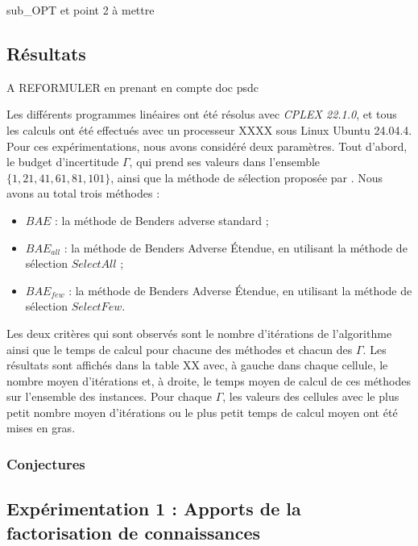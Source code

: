 \documentclass[12pt, a4paper, twoside]{article}
\numberwithin{equation}{section}
\begin{document}
	\newpage
	sub\_OPT et point 2 à mettre
	
	\subsection{Résultats} A REFORMULER en prenant en compte doc psdc
    
	Les différents programmes linéaires ont été résolus avec \textit{CPLEX 22.1.0}, et tous les calculs ont été effectués avec un processeur XXXX sous Linux Ubuntu 24.04.4. Pour ces expérimentations, nous avons considéré deux paramètres. Tout d'abord, le budget d'incertitude $\Gamma$, qui prend ses valeurs dans l'ensemble $\{1, 21, 41, 61, 81,101\}$, ainsi que la méthode de sélection proposée par \cite{portoleauTHESIS}. Nous avons au total trois méthodes :
	
	\begin{itemize}
		\item[] $BAE$ : la méthode de Benders adverse standard ;
		\item[] $BAE_{all}$ : la méthode de  Benders Adverse Étendue, en utilisant la méthode de sélection $SelectAll$ ;
		\item[] $BAE_{few}$ : la méthode de  Benders Adverse Étendue, en utilisant la méthode de sélection $SelectFew$.
	\end{itemize}
	
	Les deux critères qui sont observés sont le nombre d'itérations de l'algorithme ainsi que le temps de calcul pour chacune des méthodes et chacun des $\Gamma$. Les résultats sont affichés dans la table XX avec, à gauche dans chaque cellule, le nombre moyen d'itérations et, à droite, le temps moyen de calcul de ces méthodes sur l'ensemble des instances. Pour chaque $\Gamma$, les valeurs des cellules avec le plus petit nombre moyen d'itérations ou le plus petit temps de calcul moyen ont été mises en gras.

    \subsubsection{Conjectures}



    \subsection{Expérimentation 1 : Apports de la factorisation de connaissances}
\end{document}
